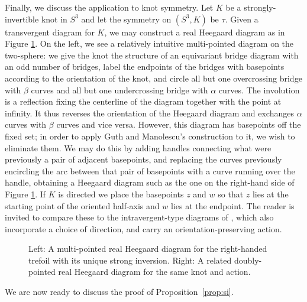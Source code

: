 \documentclass[11pt,reqno]{amsart}
\theoremstyle{definition}
\theoremstyle{remark}
\numberwithin{equation}{section}
\begin{document}
Finally, we discuss the application to knot symmetry. Let $K$ be a strongly-invertible knot in $S^3$ and let the symmetry on $(S^3,K)$ be $\tau$. Given a transvergent diagram for $K$, we may construct a real Heegaard diagram as in Figure \ref{fig:transvergentdiagrams}. On the left, we see a relatively intuitive multi-pointed diagram on the two-sphere: we give the knot the structure of an equivariant bridge diagram with an odd number of bridges, label the endpoints of the bridges with basepoints according to the orientation of the knot, and circle all but one overcrossing bridge with $\beta$ curves and all but one undercrossing bridge with $\alpha$ curves. The involution is a reflection fixing the centerline of the diagram together with the point at infinity. It thus reverses the orientation of the Heegaard diagram and exchanges $\alpha$ curves with $\beta$ curves and vice versa. However, this diagram has basepoints off the fixed set; in order to apply Guth and Manolescu's construction to it, we wish to eliminate them. We may do this by adding handles connecting what were previously a pair of adjacent basepoints, and replacing the curves previously encircling the arc between that pair of basepoints with a curve running over the handle, obtaining a Heegaard diagram such as the one on the right-hand side of Figure \ref{fig:transvergentdiagrams}. If $K$ is directed we place the basepoints $z$ and $w$ so that $z$ lies at the starting point of the oriented half-axis and $w$ lies at the endpoint. The reader is invited to compare these to the intravergent-type diagrams of \cite[Figure 4]{Parikh}, which also incorporate a choice of direction, and carry an orientation-preserving action.

\begin{figure}

\caption{Left: A multi-pointed real Heegaard diagram for the right-handed trefoil with its unique strong inversion. Right: A related doubly-pointed real Heegaard diagram for the same knot and action.}
\label{fig:transvergentdiagrams}
\end{figure}

We are now ready to discuss the proof of Proposition~\ref{prop:si}.
\end{document}
